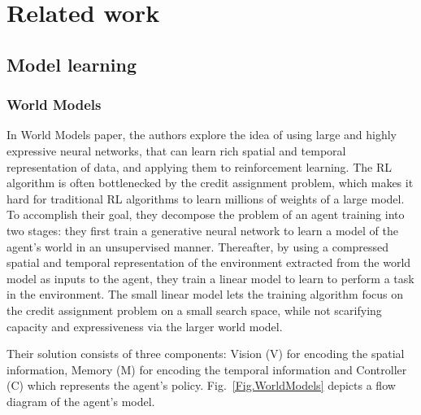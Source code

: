 \section{Related work}

\subsection{Model learning}

\subsubsection{World Models}

In World Models\cite{Algo.WorldModels} paper, the authors explore the idea of using large and highly expressive neural networks, that can learn rich spatial and temporal representation of data, and applying them to reinforcement learning. The RL algorithm is often bottlenecked by the credit assignment problem, which makes it hard for traditional RL algorithms to learn millions of weights of a large model. To accomplish their goal, they decompose the problem of an agent training into two stages: they first train a generative neural network to learn a model of the agent's world in an unsupervised manner. Thereafter, by using a compressed spatial and temporal representation of the environment extracted from the world model as inputs to the agent, they train a linear model to learn to perform a task in the environment. The small linear model lets the training algorithm focus on the credit assignment problem on a small search space, while not scarifying capacity and expressiveness via the larger world model.

Their solution consists of three components: Vision (V) for encoding the spatial information, Memory (M) for encoding the temporal information and Controller (C) which represents the agent's policy. Fig.~\ref{Fig.WorldModels} depicts a flow diagram of the agent's model.

